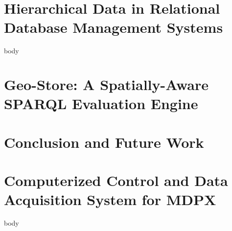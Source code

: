 \documentclass[12pt]{report}
\begin{document}
\chapter{Hierarchical Data in Relational Database Management Systems}
{body}

\chapter{Geo-Store: A Spatially-Aware SPARQL Evaluation Engine}


\chapter{Conclusion and Future Work}


\appendix
\chapter{Computerized Control and Data Acquisition System for MDPX}
{body}



\end{document}
